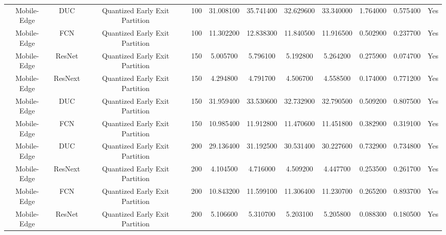 \begin{tabular}{|c||c||c||c||c||c||c||c||c||c||c|}
Mobile-Edge & DUC & Quantized Early Exit Partition & 100 & 31.008100 & 35.741400 & 32.629600 & 33.340000 & 1.764000 & 0.575400 & Yes \\
Mobile-Edge & FCN & Quantized Early Exit Partition & 100 & 11.302200 & 12.838300 & 11.840500 & 11.916500 & 0.502900 & 0.237700 & Yes \\
Mobile-Edge & ResNet & Quantized Early Exit Partition & 150 & 5.005700 & 5.796100 & 5.192800 & 5.264200 & 0.275900 & 0.074700 & Yes \\
Mobile-Edge & ResNext & Quantized Early Exit Partition & 150 & 4.294800 & 4.791700 & 4.506700 & 4.558500 & 0.174000 & 0.771200 & Yes \\
Mobile-Edge & DUC & Quantized Early Exit Partition & 150 & 31.959400 & 33.530600 & 32.732900 & 32.790500 & 0.509200 & 0.807500 & Yes \\
Mobile-Edge & FCN & Quantized Early Exit Partition & 150 & 10.985400 & 11.912800 & 11.470600 & 11.451800 & 0.382900 & 0.319100 & Yes \\
Mobile-Edge & DUC & Quantized Early Exit Partition & 200 & 29.136400 & 31.192500 & 30.531400 & 30.227600 & 0.732900 & 0.734800 & Yes \\
Mobile-Edge & ResNext & Quantized Early Exit Partition & 200 & 4.104500 & 4.716000 & 4.509200 & 4.447700 & 0.253500 & 0.261700 & Yes \\
Mobile-Edge & FCN & Quantized Early Exit Partition & 200 & 10.843200 & 11.599100 & 11.306400 & 11.230700 & 0.265200 & 0.893700 & Yes \\
Mobile-Edge & ResNet & Quantized Early Exit Partition & 200 & 5.106600 & 5.310700 & 5.203100 & 5.205800 & 0.088300 & 0.180500 & Yes \\
\bottomrule
\end{tabular}
